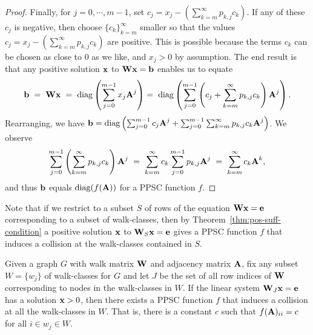 \begin{proof}
    Finally, for $j=0, \cdots, m-1$, set $c_j = x_j - \left( \sum_{k=m}^{\infty} p_{k,j} c_k \right)$.
    If any of these $c_j$ is negative, then choose $\{ c_k \}_{k=m}^{\infty}$ smaller so that the values $c_j = x_j - \left( \sum_{k=m}^{\infty} p_{k,j} c_k \right)$ are positive.
    This is possible because the terms $c_k$ can be chosen as close to 0 as we like, and $x_j > 0$ by assumption.
    The end result is that any positive solution $\textbf{x}$ to $\textbf{W}\textbf{x} = \textbf{b}$ enables us to equate
    \[
        \textbf{b} \hspace{3pt} = \hspace{3pt} \textbf{W} \textbf{x}
         \hspace{3pt} =
        \hspace{3pt} \operatorname{diag}\left( \sum_{j=0}^{m-1} x_j \textbf{A}^j \right)
            = \hspace{3pt} \operatorname{diag}\left( \sum_{j=0}^{m-1} \left( c_j +  \sum_{k=m}^{\infty} p_{k,j} c_k \right) \textbf{A}^j \right).
    \]
    Rearranging, we have $\textbf{b} = \operatorname{diag}\left( \sum_{j=0}^{m-1} c_j \textbf{A}^j +  \sum_{j=0}^{m-1}\sum_{k=m}^{\infty} p_{k,j} c_k \textbf{A}^j \right)$.
    We observe
    \[
       \sum_{j=0}^{m-1} \left( \sum_{k=m}^{\infty} p_{k,j} c_k \right) \textbf{A}^j
     \hspace{3pt} = \hspace{3pt}
       \sum_{k=m}^{\infty} c_k \sum_{j=0}^{m-1} p_{k,j}  \textbf{A}^j
     \hspace{3pt} = \hspace{3pt}
        \sum_{k=m}^{\infty} c_k \textbf{A}^k,
    \]
    and thus $\textbf{b}$ equals $\operatorname{diag}(f(\textbf{A}))$ for a PPSC function $f$.
\end{proof}

Note that if we restrict to a subset $S$ of rows of the equation $\textbf{W}\textbf{x} = \textbf{e}$ corresponding to a subset of walk-classes,
then by Theorem~\ref{thm:pos-suff-condition} a positive solution $\textbf{x}$ to $\textbf{W}_S\textbf{x} = \textbf{e}$ gives a PPSC function $f$ that induces a collision at the walk-classes contained in $S$.

\begin{corollary}\label{cor:pos-suff-condition}
  Given a graph $G$ with walk matrix $\textbf{W}$ and adjacency matrix $\textbf{A}$, fix any subset $W = \{w_j\}$ of walk-classes for $G$ and let $J$ be the set of all row indices of $\textbf{W}$ corresponding to nodes in the walk-classes in $W$.
  If the linear system $\textbf{W}_J\textbf{x} = \textbf{e}$ has a solution $\textbf{x} > 0$, then there exists a PPSC function $f$ that induces a collision at all the walk-classes in $W$.
  That is, there is a constant $c$ such that $f(\textbf{A})_{ii} = c$ for all $i \in w_j \in W$.
\end{corollary}

